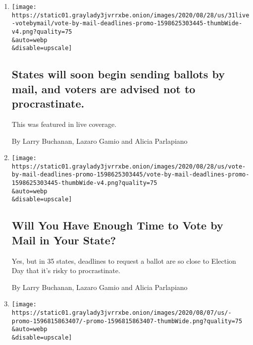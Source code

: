 \begin{enumerate}
\def\labelenumi{\arabic{enumi}.}
\item
  \href{/live/2020/08/31/us/trump-vs-biden/states-will-soon-begin-sending-ballots-by-mail-and-voters-are-advised-not-to-procrastinate}{}

  \texttt{[image: https://static01.graylady3jvrrxbe.onion/images/2020/08/28/us/31live-votebymail/vote-by-mail-deadlines-promo-1598625303445-thumbWide-v4.png?quality=75\\\&auto=webp\\\&disable=upscale]}

  \hypertarget{states-will-soon-begin-sending-ballots-by-mail-and-voters-are-advised-not-to-procrastinate}{%
  \subsection{States will soon begin sending ballots by mail, and voters
  are advised not to
  procrastinate.}\label{states-will-soon-begin-sending-ballots-by-mail-and-voters-are-advised-not-to-procrastinate}}

  This was featured in live coverage.

  By Larry Buchanan, Lazaro Gamio and Alicia Parlapiano
\item
  \href{/interactive/2020/08/31/us/politics/vote-by-mail-deadlines.html}{}

  \texttt{[image: https://static01.graylady3jvrrxbe.onion/images/2020/08/28/us/vote-by-mail-deadlines-promo-1598625303445/vote-by-mail-deadlines-promo-1598625303445-thumbWide-v4.png?quality=75\\\&auto=webp\\\&disable=upscale]}

  \hypertarget{will-you-have-enough-time-to-vote-by-mail-in-your-state}{%
  \subsection{Will You Have Enough Time to Vote by Mail in Your
  State?}\label{will-you-have-enough-time-to-vote-by-mail-in-your-state}}

  Yes, but in 35 states, deadlines to request a ballot are so close to
  Election Day that it's risky to procrastinate.

  By Larry Buchanan, Lazaro Gamio and Alicia Parlapiano
\item
  \href{/2020/08/07/upshot/unemployment-benefits-racial-disparity.html}{}

  \texttt{[image: https://static01.graylady3jvrrxbe.onion/images/2020/08/07/us/-promo-1596815863407/-promo-1596815863407-thumbWide.png?quality=75\\\&auto=webp\\\&disable=upscale]}


\end{enumerate}
